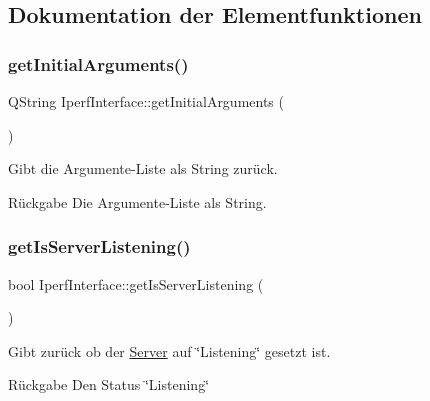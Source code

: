 \subsection{Dokumentation der Elementfunktionen}
\hypertarget{class_iperf_interface_a93b05412f77de1fc4cb57e5b03f378dd}{}\label{class_iperf_interface_a93b05412f77de1fc4cb57e5b03f378dd} 
\subsubsection{\texorpdfstring{get\+Initial\+Arguments()}{getInitialArguments()}}
{\footnotesize\ttfamily Q\+String Iperf\+Interface\+::get\+Initial\+Arguments (\begin{DoxyParamCaption}{ }\end{DoxyParamCaption})}



Gibt die Argumente-\/\+Liste als String zurück. 

\begin{DoxyReturn}{Rückgabe}
Die Argumente-\/\+Liste als String. 
\end{DoxyReturn}
\hypertarget{class_iperf_interface_a68b6291bcbf2ad413f4efa00ebf9b66d}{}\label{class_iperf_interface_a68b6291bcbf2ad413f4efa00ebf9b66d} 
\subsubsection{\texorpdfstring{get\+Is\+Server\+Listening()}{getIsServerListening()}}
{\footnotesize\ttfamily bool Iperf\+Interface\+::get\+Is\+Server\+Listening (\begin{DoxyParamCaption}{ }\end{DoxyParamCaption})}



Gibt zurück ob der \hyperlink{class_server}{Server} auf \char`\"{}\+Listening\char`\"{} gesetzt ist. 

\begin{DoxyReturn}{Rückgabe}
Den Status \char`\"{}\+Listening\char`\"{} 
\end{DoxyReturn}
\hypertarget{class_iperf_interface_a62e1dad7ad79df8307384b76a14f6eed}{}\label{class_iperf_interface_a62e1dad7ad79df8307384b76a14f6eed} 

